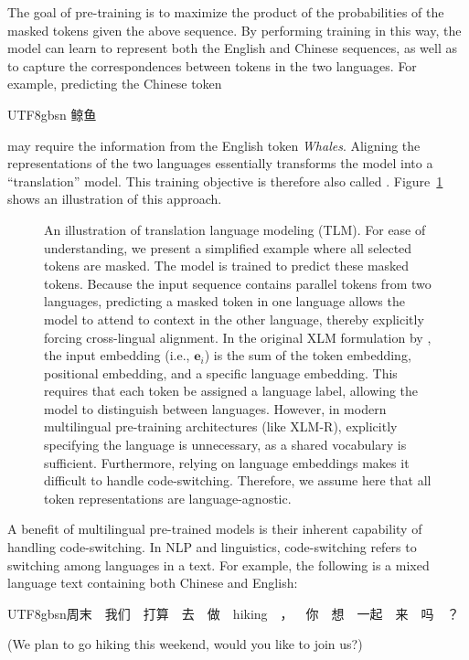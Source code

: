 \noindent The goal of pre-training is to maximize the product of the probabilities of the masked tokens given the above sequence. By performing training in this way, the model can learn to represent both the English and Chinese sequences, as well as to capture the correspondences between tokens in the two languages. For example, predicting the Chinese token \begin{CJK*}{UTF8}{gbsn} 鲸鱼\end{CJK*} may require the information from the English token \textit{Whales}. Aligning the representations of the two languages essentially transforms the model into a ``translation'' model. This training objective is therefore also called . Figure~\ref{fig:translation-language-modeling} shows an illustration of this approach.

\begin{figure}[!t]
\centering

\caption{An illustration of translation language modeling (TLM). For ease of understanding, we present a simplified example where all selected tokens are masked. The model is trained to predict these masked tokens. Because the input sequence contains parallel tokens from two languages, predicting a masked token in one language allows the model to attend to context in the other language, thereby explicitly forcing cross-lingual alignment. In the original XLM formulation by \citet{lample-conneau:2019cross}, the input embedding (i.e., $\mathbf{e}_i$) is the sum of the token embedding, positional embedding, and a specific language embedding. This requires that each token be assigned a language label, allowing the model to distinguish between languages. However, in modern multilingual pre-training architectures (like XLM-R), explicitly specifying the language is  unnecessary, as a shared vocabulary is sufficient. Furthermore, relying on language embeddings makes it difficult to handle code-switching. Therefore, we assume here that all token representations are language-agnostic.}
\label{fig:translation-language-modeling}
\end{figure}

A benefit of multilingual pre-trained models is their inherent capability of handling code-switching. In NLP and linguistics, code-switching refers to switching among languages in a text. For example, the following is a mixed language text containing both Chinese and English:

\vspace{0.5em}
\begin{center}
\begin{CJK*}{UTF8}{gbsn}周末\ \ 我们\ \ 打算\ \ 去\ \ 做\ \ hiking\ \ ，\ \ 你\ \ 想\ \ 一起\ \ 来\ \ 吗\ \ ？\end{CJK*}

\small{(We plan to go hiking this weekend, would you like to join us?)}
\end{center}
\vspace{0.5em}

